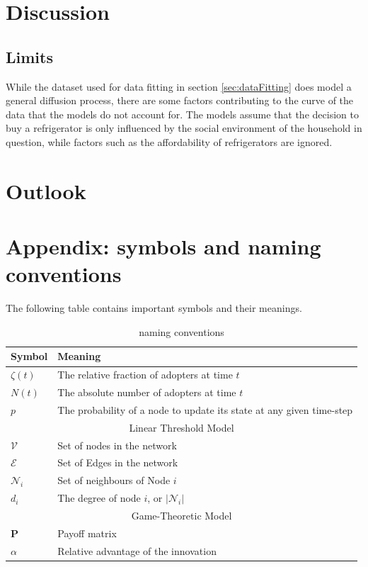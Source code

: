 \documentclass[11pt]{article}
\begin{document}
	\section{Discussion}
	\subsection{Limits}
	While the dataset used for data fitting in section \ref{sec:dataFitting} does model a general diffusion process, there are some factors contributing to the curve of the data that the models do not account for. The models assume that the decision to buy a refrigerator is only influenced by the social environment of the household in question, while factors such as the affordability of refrigerators are ignored.
	
	\section{Outlook}
	
	\newpage
	\appendix
	\section{Appendix: symbols and naming conventions}
	The following table contains important symbols and their meanings.
	\begin{table}[H]
		\centering
		\begin{tabularx}{\textwidth}{|p{1cm}|X|}
			\hline
			Symbol & Meaning \\
			\hline
			$\zeta(t)$ & The relative fraction of adopters at time $t$\\ \hline
			$N(t)$ & The absolute number of adopters at time $t$ \\ \hline
			$p$    & The probability of a node to update its state at any given time-step \\ \hline
			
			\multicolumn{2}{|c|}{Linear Threshold Model} \\ \hline
			$\mathcal{V}$ & Set of nodes in the network \\ \hline
			$\mathcal{E}$ & Set of Edges in the network \\ \hline
			$\mathcal{N}_i$ & Set of neighbours of Node $i$ \\ \hline
			$d_i$ & The degree of node $i$, or $|\mathcal{N}_i|$ \\ \hline
			
			\multicolumn{2}{|c|}{Game-Theoretic Model} \\ \hline
			$\mathbf{P}$ & Payoff matrix \\ \hline
			$\alpha$ & Relative advantage of the innovation \\ \hline
			
		\end{tabularx}
		\caption{naming conventions}
		\label{tab:namings}
	\end{table} 
	
\end{document}
